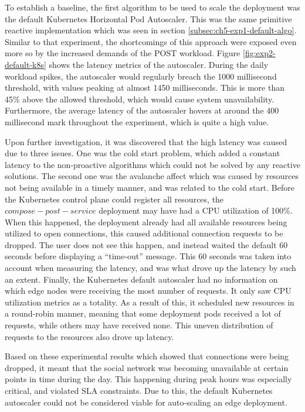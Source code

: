 To establish a baseline, the first algorithm to be used to scale the deployment was the default Kubernetes Horizontal Pod Autoscaler. This was the same primitive reactive implementation which was seen in section \ref{subsec:ch5-exp1-default-algo}. Similar to that experiment, the shortcomings of this approach were exposed even more so by the increased demands of the POST workload. Figure \ref{fig:exp2-default-k8s} shows the latency metrics of the autoscaler. During the daily workload spikes, the autoscaler would regularly breach the 1000 millisecond threshold, with values peaking at almost 1450 milliseconds. This is more than 45\% above the allowed threshold, which would cause system unavailability. Furthermore, the average latency of the autoscaler hovers at around the 400 millisecond mark throughout the experiment, which is quite a high value.\par

Upon further investigation, it was discovered that the high latency was caused due to three issues. One was the cold start problem, which added a constant latency to the non-proactive algorithms which could not be solved by any reactive solutions. The second one was the avalanche affect which was caused by resources not being available in a timely manner, and was related to the cold start. Before the Kubernetes control plane could register all resources, the $compose-post-service$ deployment may have had a CPU utilization of 100\%. When this happened, the deployment already had all available resources being utilized to open connections, this caused additional connection requests to be dropped. The user does not see this happen, and instead waited the default 60 seconds before displaying a ``time-out'' message. This 60 seconds was taken into account when measuring the latency, and was what drove up the latency by such an extent. Finally, the Kubernetes default autoscaler had no information on which edge nodes were receiving the most number of requests. It only saw CPU utilization metrics as a totality. As a result of this, it scheduled new resources in a round-robin manner, meaning that some deployment pods received a lot of requests, while others may have received none. This uneven distribution of requests to the resources also drove up latency.\par

Based on these experimental results which showed that connections were being dropped, it meant that the social network was becoming unavailable at certain points in time during the day. This happening during peak hours was especially critical, and violated SLA constraints. Due to this, the default Kubernetes autoscaler could not be considered viable for auto-scaling an edge deployment.


